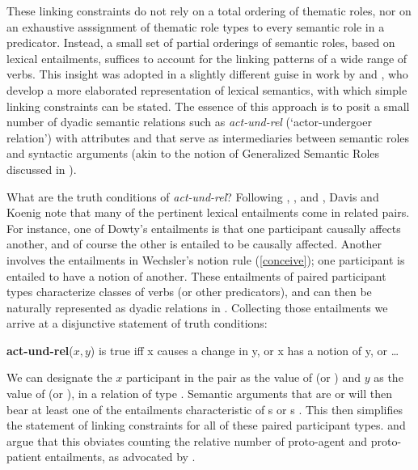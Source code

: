 \documentclass[output=paper
                ,modfonts
                ,nonflat
	        ,collection
	        ,collectionchapter
	        ,collectiontoclongg
 	        ,biblatex
                ,babelshorthands
                ,newtxmath
                ,draftmode
                ,colorlinks, citecolor=brown
]{./langsci/langscibook}
\begin{document}
These linking constraints do not rely on a total ordering of thematic roles, nor on an exhaustive asssignment of thematic role types to every semantic role in a predicator. Instead, a small set of partial orderings of semantic roles, based on lexical entailments, suffices to account for the linking patterns of a wide range of verbs. 
This insight was adopted in a slightly different guise in work by \citet{Davis1996,Davis2001} and \cite{DavisandKoenig2000b}, who develop a more elaborated representation of lexical semantics, with which simple linking constraints can be stated.
The essence of this approach is to posit a small number of dyadic semantic relations such as \textit{act-und-rel} (`actor-undergoer relation') with attributes    and   that serve as intermediaries between semantic roles and syntactic arguments (akin to the notion of Generalized Semantic Roles discussed in \citealt{VanValin1999}).  

What are the truth conditions of \textit{act-und-rel}?  
Following \citet{Fillmore1977}, \citet{Dowty1991}, and \citet{Wechsler1995b}, Davis and Koenig note that many of the pertinent lexical entailments come in related pairs.
For instance, one of Dowty's entailments is that one participant causally affects another, and of course the other is entailed to be causally affected.
Another involves the entailments in Wechsler's notion rule (\ref{conceive}); one participant is entailed to have a notion of another. 
These entailments of paired participant types characterize classes of verbs (or other predicators), and can then be naturally represented as dyadic relations in .  Collecting those entailments we arrive at a disjunctive statement of truth conditions:

\begin{exe}
\ex \textbf{act-und-rel}($x,y$) is true iff x causes a change in y, or x has a notion of y, or \ldots
\end{exe}

\noindent
We can designate the $x$ participant  in the pair as the value of  (or ) and $y$ as the value of  (or ), in a relation of type .   Semantic arguments that are  or  will then bear at least one of the entailments characteristic of s or s \citep[72]{DavisandKoenig2000b}. This then simplifies the statement of linking constraints for all of these paired participant types.
\citet{Davis1996} and \citet{KoenigandDavis2001} argue that this obviates counting the relative number of proto-agent and proto-patient entailments, as advocated by \citet{Dowty1991}.
\end{document}
